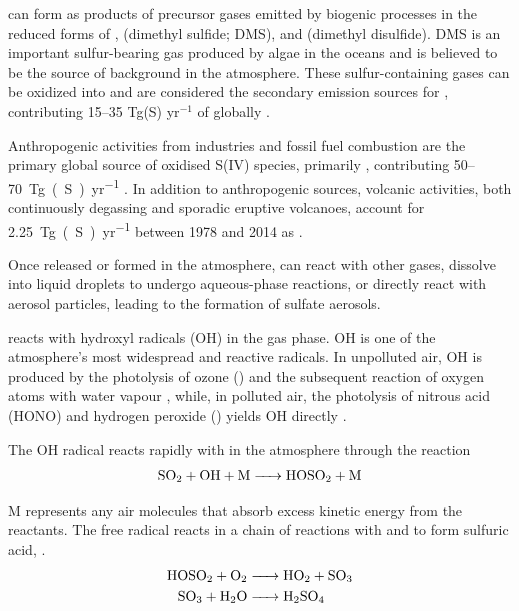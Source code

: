  can form as products of precursor gases emitted by biogenic processes in the reduced forms of ,  (dimethyl sulfide; DMS), and  (dimethyl disulfide). DMS is an important sulfur-bearing gas produced by algae in the oceans and is believed to be the source of background  in the atmosphere. These sulfur-containing gases can be oxidized into  and are considered the secondary emission sources for , contributing 15--35 Tg(S) yr$^{-1}$ of  globally \citep{lanaUpdatedClimatologySurface2011}. 

Anthropogenic activities from industries and fossil fuel combustion are the primary global source of oxidised S(IV) species, primarily , contributing 50--\qty{70}{Tg(S)~yr^{-1}} \citep{forsterEarthEnergyBudget2021}. In addition to anthropogenic sources, volcanic activities, both continuously degassing and sporadic eruptive volcanoes, account for \qty{2.25}{Tg(S)~yr^{-1}} between 1978 and 2014 as  \citep{carnMultidecadalSatelliteMeasurements2016}. 

Once released or formed in the atmosphere,  can react with other gases, dissolve into liquid droplets to undergo aqueous-phase reactions, or directly react with aerosol particles, leading to the formation of sulfate aerosols. 

 reacts with hydroxyl radicals (OH) in the gas phase. OH is one of the atmosphere's most widespread and reactive radicals. In unpolluted air, OH is produced by the photolysis of ozone () and the subsequent reaction of oxygen atoms with water vapour \citep{wayneChemistryAtmospheresIntroduction2006}, while, in polluted air, the photolysis of nitrous acid (HONO) and hydrogen peroxide () yields OH directly \citep{zhongNitrousAcidBudgets2023}. 

The OH radical reacts rapidly with  in the atmosphere through the reaction
\begin{align}
\ce{SO2 + OH + M -> HOSO2 + M}    
\label{ch1:eq:so2-oh}
\end{align}

M represents any air molecules that absorb excess kinetic energy from the reactants. The free radical  reacts in a chain of reactions with  and  to form sulfuric acid, .
\begin{align}
\ce{HOSO2 + O2 &-> HO2 + SO3}\\
\ce{SO3 + H2O &-> H2SO4}
\label{eq:so3_h2o}
\end{align}

